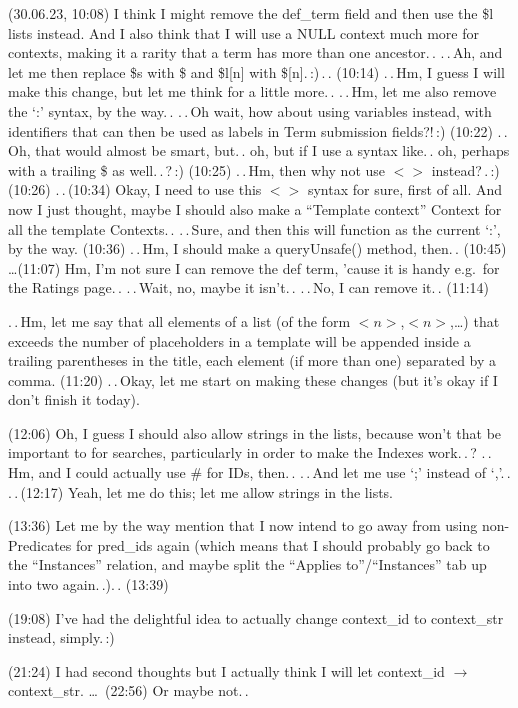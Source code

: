 \documentclass{report}
\begin{document}
(30.06.23, 10:08) I think I might remove the def\_term field and then use the \$l lists instead. And I also think that I will use a NULL context much more for contexts, making it a rarity that a term has more than one ancestor.\,. .\,.\,Ah, and let me then replace \$s with \$ and \$l[n] with \$[n].\,:)\,.\,. (10:14) .\,.\,Hm, I guess I will make this change, but let me think for a little more.\,. .\,.\,Hm, let me also remove the `:' syntax, by the way.\,. .\,.\,Oh wait, how about using variables instead, with identifiers that can then be used as labels in Term submission fields?!\,:) (10:22) .\,.\,Oh, that would almost be smart, but.\,. oh, but if I use a syntax like.\,. oh, perhaps with a trailing \$ as well.\,.\,?\,:) (10:25) .\,.\,Hm, then why not use $<>$ instead?\,.\,:) (10:26) .\,.\,(10:34) Okay, I need to use this $<>$ syntax for sure, first of all. And now I just thought, maybe I should also make a ``Template context'' Context for all the template Contexts.\,. .\,.\,Sure, and then this will function as the current `:', by the way. (10:36) .\,.\,Hm, I should make a queryUnsafe() method, then.\,. (10:45) \ldots (11:07) Hm, I'm not sure I can remove the def term, 'cause it is handy e.g.\ for the Ratings page.\,. .\,.\,Wait, no, maybe it isn't.\,. .\,.\,No, I can remove it.\,. (11:14)

.\,.\,Hm, let me say that all elements of a list (of the form $<n>$,$<n>$,\ldots) that exceeds the number of placeholders in a template will be appended inside a trailing parentheses in the title, each element (if more than one) separated by a comma. (11:20) .\,.\,Okay, let me start on making these changes (but it's okay if I don't finish it today).

(12:06) Oh, I guess I should also allow strings in the lists, because won't that be important to for searches, particularly in order to make the Indexes work.\,.\,? .\,.\,Hm, and I could actually use \# for IDs, then.\,. .\,.\,And let me use `;' instead of `,'.\,. .\,.\,(12:17) Yeah, let me do this; let me allow strings in the lists.

(13:36) Let me by the way mention that I now intend to go away from using non-Predicates for pred\_ids again (which means that I should probably go back to the ``Instances'' relation, and maybe split the ``Applies to''/``Instances'' tab up into two again.\,.).\,. (13:39)

(19:08) I've had the delightful idea to actually change context\_id to context\_str instead, simply.\,:)

(21:24) I had second thoughts but I actually think I will let context\_id $\to$ context\_str.
\ldots\ (22:56) Or maybe not.\,.
\end{document}
